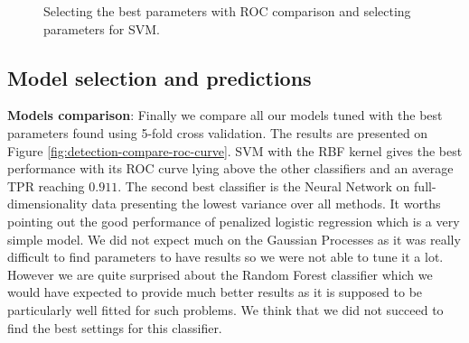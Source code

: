 \documentclass[10pt,a4paper]{article}
\begin{document}
     \begin{figure}[ht]
       \center
    	\hfill
	\caption{Selecting the best parameters with ROC comparison and selecting parameters for SVM.}

  \end{figure}


  \subsection{Model selection and predictions}
    \textbf{Models comparison}: Finally we compare all our models tuned with the best parameters found using 5-fold cross validation. The results are presented on Figure \ref{fig:detection-compare-roc-curve}. SVM with the RBF kernel gives the best performance with its ROC curve lying above the other classifiers and an average TPR reaching $0.911$. The second best classifier is the Neural Network on full-dimensionality data presenting the lowest variance over all methods. It worths pointing out the good performance of penalized logistic regression which is a very simple model. We did not expect much on the Gaussian Processes as it was really difficult to find parameters to have results so we were not able to tune it a lot. However we are quite surprised about the Random Forest classifier which we would have expected to provide much better results as it is supposed to be particularly well fitted for such problems. We think that we did not succeed to find the best settings for this classifier.
\end{document}
